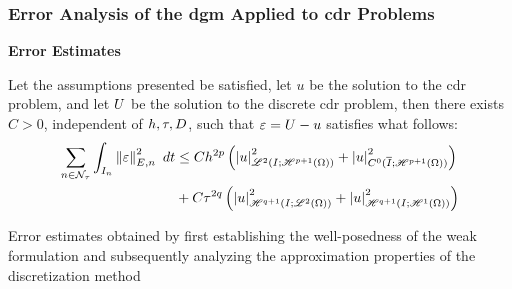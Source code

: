 \begin{frame}
    \frametitle{Error Analysis of the \acrshort{dgm} Applied to \acrshort{cdr} Problems}

    \vspace*{\fill}
    \begin{center}
        {\color{\accentcolor} \Large \textbf{Error Estimates}}
        \vspace*{0.25cm}

        \begin{minipage}{0.75\textwidth}
            \begin{theorem}
                Let the assumptions presented be satisfied, let $u$ be the solution to the \acrshort{cdr} problem, and let $U$ be the solution to the discrete \acrshort{cdr} problem, then there exists $C > 0$, independent of $h, \tau, D$, such that $\varepsilon = U - u$ satisfies what follows:
                \begin{align*}
                    \sum_{n \in \mathcal{N}_{\tau}} \int_{I_n}  \left\lVert \varepsilon \right\rVert_{E, n}^2  ~ d t &\leq C h^{2p} \left( \left\lvert u \right\rvert_{\mathscr{L}^{2}(I; \mathscr{H}^{p + 1}(\Omega))}^2 + \left\lvert u \right\rvert_{C^0(\overline{I}; \mathscr{H}^{p + 1}(\Omega))}^2 \right) \\
                    &+ C \tau^{2q} \left( \left\lvert u \right\rvert_{\mathscr{H}^{q + 1}(I; \mathscr{L}^{2}(\Omega))}^2 + \left\lvert u \right\rvert_{\mathscr{H}^{q + 1}(I; \mathscr{H}^{1}(\Omega))}^2 \right)
                \end{align*}
            \end{theorem}
        \end{minipage}
    \end{center}

    \vspace*{\fill}

    \begin{flushleft}
        \begin{minipage}{0.75\textwidth}
            {\footnotesize Error estimates obtained by first establishing the well-posedness of the weak formulation and subsequently analyzing the approximation properties of the discretization method}
        \end{minipage}
    \end{flushleft}
    
\end{frame}
